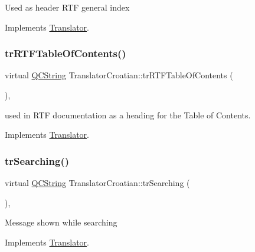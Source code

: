 Used as header R\+TF general index 

Implements \mbox{\hyperlink{class_translator}{Translator}}.

\mbox{\label{class_translator_croatian_ab6959dccc3e12d855f27ee6f3fd1488e}} 
\subsubsection{\texorpdfstring{trRTFTableOfContents()}{trRTFTableOfContents()}}
{\footnotesize\ttfamily virtual \mbox{\hyperlink{class_q_c_string}{Q\+C\+String}} Translator\+Croatian\+::tr\+R\+T\+F\+Table\+Of\+Contents (\begin{DoxyParamCaption}{ }\end{DoxyParamCaption})\hspace{0.3cm}{\ttfamily [inline]}, {\ttfamily [virtual]}}

used in R\+TF documentation as a heading for the Table of Contents. 

Implements \mbox{\hyperlink{class_translator}{Translator}}.

\mbox{\label{class_translator_croatian_a243180cf0268eaad696f4fc0373465a6}} 
\subsubsection{\texorpdfstring{trSearching()}{trSearching()}}
{\footnotesize\ttfamily virtual \mbox{\hyperlink{class_q_c_string}{Q\+C\+String}} Translator\+Croatian\+::tr\+Searching (\begin{DoxyParamCaption}{ }\end{DoxyParamCaption})\hspace{0.3cm}{\ttfamily [inline]}, {\ttfamily [virtual]}}

Message shown while searching 

Implements \mbox{\hyperlink{class_translator}{Translator}}.

\mbox{\label{class_translator_croatian_a7f376084ac5b3f34dcd423e046a8b4c4}} 
